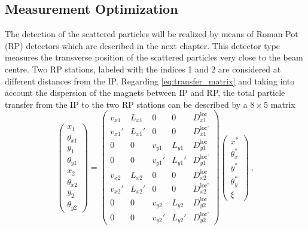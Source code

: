 \subsection{Measurement Optimization}\label{chap:local_dispersion}
The detection of the scattered particles will be realized by means of Roman Pot (RP) detectors which are described in the next chapter. This detector type measures the transverse position of the scattered particles very close to the beam centre. Two RP stations, labeled with the indices 1 and 2 are considered at different distances from the IP. Regarding \eqref{eq:transfer_matrix} and taking into account the dispersion of the magnets between IP and RP, the total particle transfer from the IP to the two RP stations can be described by a $8 \times 5$ matrix
%
%
\begin{equation} 
\left( \begin{array}{c}
x_1 \\ 
\theta_{x1} \\ 
y_1 \\ 
\theta_{y1} \\ 
x_2 \\
\theta_{x2} \\ 
y_2 \\ 
\theta_{y2} 
\end{array} \right)
=
\left( \begin{array}{ccccc}
v_{x1} & L_{x1} & 0 & 0 & D_{x1}^\text{loc} \\ 
v_{x1}' & L_{x1}' & 0 & 0 & D_{x1}^\text{loc'} \\ 
0 & 0 & v_{y1} & L_{y1} & D_{y1}^\text{loc} \\ 
0 & 0 & v_{y1}' & L_{y1}' & D_{y1}^\text{loc'} \\ 
v_{x2} & L_{x2} & 0 & 0 & D_{x2}^\text{loc} \\ 
v_{x2}' & L_{x2}' & 0 & 0 & D_{x2}^\text{loc'} \\ 
0 & 0 & v_{y2} & L_{y2} & D_{y2}^\text{loc} \\ 
0 & 0 & v_{y2}' & L_{y2}' & D_{y2}^\text{loc'} 
\end{array}\right)
\left( \begin{array}{c}
x^* \\ 
\theta_x^* \\ 
y^* \\ 
\theta_y^* \\
\xi 
\end{array}\right) \, ,
\label{ts}
\end{equation}
%
%
